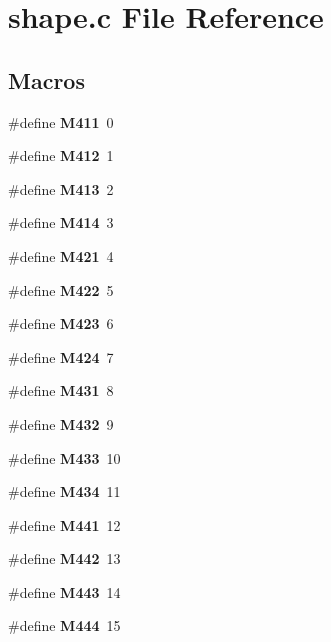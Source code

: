 \section{shape.\+c File Reference}
\label{shape_8c}
\subsection*{Macros}
\begin{DoxyCompactItemize}
\item 
\#define {\bf M411}~0
\item 
\#define {\bf M412}~1
\item 
\#define {\bf M413}~2
\item 
\#define {\bf M414}~3
\item 
\#define {\bf M421}~4
\item 
\#define {\bf M422}~5
\item 
\#define {\bf M423}~6
\item 
\#define {\bf M424}~7
\item 
\#define {\bf M431}~8
\item 
\#define {\bf M432}~9
\item 
\#define {\bf M433}~10
\item 
\#define {\bf M434}~11
\item 
\#define {\bf M441}~12
\item 
\#define {\bf M442}~13
\item 
\#define {\bf M443}~14
\item 
\#define {\bf M444}~15
\end{DoxyCompactItemize}
